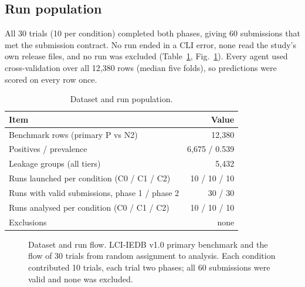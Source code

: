 \documentclass[11pt,a4paper]{article}
\begin{document}
\subsection*{Run population}
All 30 trials (10 per condition) completed both phases, giving 60 submissions that met the submission contract. No run ended in a CLI error, none read the study's own release files, and no run was excluded (Table~\ref{tab:population}, Fig.~\ref{fig:flow}). Every agent used cross-validation over all 12,380 rows (median five folds), so predictions were scored on every row once.

\begin{table}[ht]
\centering
\caption{Dataset and run population.}
\label{tab:population}
\begin{tabular}{@{}lr@{}}
\toprule
Item & Value\\
\midrule
Benchmark rows (primary P vs N2) & 12,380\\
Positives / prevalence & 6,675 / 0.539\\
Leakage groups (all tiers) & 5,432\\
Runs launched per condition (C0 / C1 / C2) & 10 / 10 / 10\\
Runs with valid submissions, phase 1 / phase 2 & 30 / 30\\
Runs analysed per condition (C0 / C1 / C2) & 10 / 10 / 10\\
Exclusions & none\\
\bottomrule
\end{tabular}
\end{table}

\begin{figure}[ht]
\centering
{}
\caption{Dataset and run flow. LCI-IEDB v1.0 primary benchmark and the flow of 30 trials from random assignment to analysis. Each condition contributed 10 trials, each trial two phases; all 60 submissions were valid and none was excluded.}
\label{fig:flow}
\end{figure}
\end{document}
